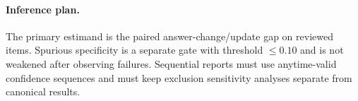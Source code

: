 \paragraph{Inference plan.}
The primary estimand is the paired answer-change/update gap on reviewed items. Spurious specificity is a separate gate with threshold $\leq 0.10$ and is not weakened after observing failures. Sequential reports must use anytime-valid confidence sequences and must keep exclusion sensitivity analyses separate from canonical results.

